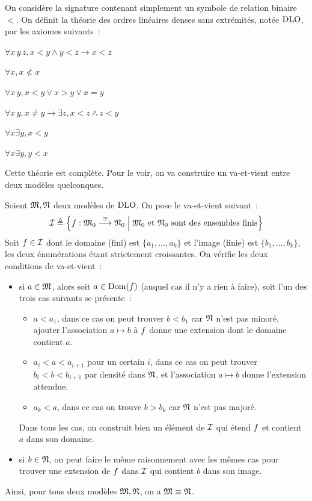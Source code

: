 \begin{example}
  On considère la signature contenant simplement un symbole de relation binaire
  $<$. On définit la théorie des ordres linéaires denses sans extrémités,
  notée $\operatorname{DLO}$, par les axiomes suivants~:

  \vspace{5pt}
  \begin{itemize}
    \begin{minipage}{0.45\textwidth}
    \item $\forall x\,y\,z,x<y\land y<z\to x<z$
    \item $\forall x,x\nless x$
    \item $\forall x\,y, x < y \lor x > y \lor x = y$
    \end{minipage}
    \begin{minipage}{0.45\textwidth}
    \item $\forall x\,y,x\neq y \to \exists z, x < z \land z < y$
    \item $\forall x \exists y, x < y$
    \item $\forall x \exists y, y < x$
    \end{minipage}
  \end{itemize}
  Cette théorie est complète. Pour le voir, on va construire un va-et-vient
  entre deux modèles quelconques.

  Soient $\mathfrak{M},\mathfrak{N}$ deux modèles de $\operatorname{DLO}$. On pose le va-et-vient
  suivant~:
  \[\mathcal{I}\triangleq
  \left\{ f : \displaystyle \mathfrak{M}_0 \overset{\cong}{\longrightarrow} \mathfrak{N}_0 \;\middle\vert\; \mathfrak{M}_0\text{ et }
    \mathfrak{N}_0\text{ sont des ensembles finis} \right\}\]
  Soit $f \in \mathcal{I}$ dont le domaine (fini) est $\{a_1,\ldots,a_k\}$ et
  l'image (finie) est $\{b_1,\ldots,b_k\}$, les deux énumérations étant
  strictement croissantes. On vérifie les deux conditions de va-et-vient~:
  \begin{itemize}
  \item si $a\in \mathfrak{M}$, alors soit $a \in \operatorname{Dom}(f)$ (auquel cas il n'y
    a rien à faire), soit l'un des trois cas suivants se présente~:
    \begin{itemize}
    \item $a < a_1$, dans ce cas on peut trouver $b < b_1$ car $\mathfrak{N}$ n'est
      pas minoré, ajouter l'association $a\mapsto b$ à $f$ donne une
      extension dont le domaine contient $a$.
    \item $a_i < a < a_{i+1}$ pour un certain $i$, dans ce cas on peut trouver
      $b_i < b < b_{i+1}$ par densité dans $\mathfrak{N}$, et l'association
      $a\mapsto b$ donne l'extension attendue.
    \item $a_k < a$, dans ce cas on trouve $b > b_k$ car $\mathfrak{N}$ n'est pas
      majoré.
    \end{itemize}
    Dans tous les cas, on construit bien un élément de $\mathcal{I}$ qui étend
    $f$ et contient $a$ dans son domaine.
  \item si $b \in \mathfrak{N}$, on peut faire le même raisonnement avec les mêmes
    cas pour trouver une extension de $f$ dans $\mathcal{I}$ qui contient
    $b$ dans son image.
  \end{itemize}
  Ainsi, pour tous deux modèles $\mathfrak{M},\mathfrak{N}$, on a $\mathfrak{M}\equiv\mathfrak{N}$.


\end{example}
